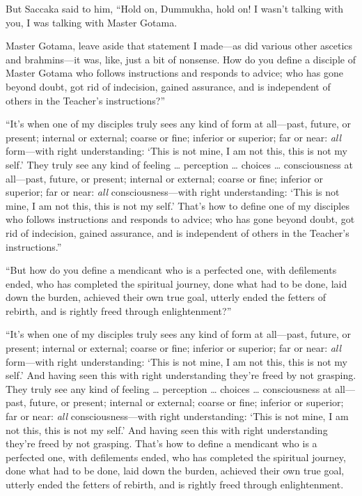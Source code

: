 \documentclass[12pt,openany]{book}%
\begin{document}
But Saccaka said to him, “Hold on, Dummukha, hold on! I wasn’t talking with you, I was talking with Master Gotama. 

Master Gotama, leave aside that statement I made—as did various other ascetics and brahmins—it was, like, just a bit of nonsense. How do you define a disciple of Master Gotama who follows instructions and responds to advice; who has gone beyond doubt, got rid of indecision, gained assurance, and is independent of others in the Teacher’s instructions?” 

“It’s when one of my disciples truly sees any kind of form at all—past, future, or present; internal or external; coarse or fine; inferior or superior; far or near: \emph{all} form—with right understanding: ‘This is not mine, I am not this, this is not my self.’ They truly see any kind of feeling … perception … choices … consciousness at all—past, future, or present; internal or external; coarse or fine; inferior or superior; far or near: \emph{all} consciousness—with right understanding: ‘This is not mine, I am not this, this is not my self.’ That’s how to define one of my disciples who follows instructions and responds to advice; who has gone beyond doubt, got rid of indecision, gained assurance, and is independent of others in the Teacher’s instructions.” 

“But how do you define a mendicant who is a perfected one, with defilements ended, who has completed the spiritual journey, done what had to be done, laid down the burden, achieved their own true goal, utterly ended the fetters of rebirth, and is rightly freed through enlightenment?” 

“It’s when one of my disciples truly sees any kind of form at all—past, future, or present; internal or external; coarse or fine; inferior or superior; far or near: \emph{all} form—with right understanding: ‘This is not mine, I am not this, this is not my self.’ And having seen this with right understanding they’re freed by not grasping. They truly see any kind of feeling … perception … choices … consciousness at all—past, future, or present; internal or external; coarse or fine; inferior or superior; far or near: \emph{all} consciousness—with right understanding: ‘This is not mine, I am not this, this is not my self.’ And having seen this with right understanding they’re freed by not grasping. That’s how to define a mendicant who is a perfected one, with defilements ended, who has completed the spiritual journey, done what had to be done, laid down the burden, achieved their own true goal, utterly ended the fetters of rebirth, and is rightly freed through enlightenment. 
\end{document}
